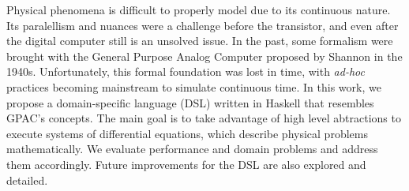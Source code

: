 
Physical phenomena is difficult to properly model due to its continuous nature. Its paralellism and nuances were a challenge before the transistor, and even after the digital computer still is an unsolved issue. In the past, some formalism were brought with the General Purpose Analog Computer proposed by Shannon in the 1940s. Unfortunately, this formal foundation was lost in time, with \textit{ad-hoc} practices becoming mainstream to simulate continuous time. In this work, we propose a domain-specific language (DSL) written in Haskell that resembles GPAC's concepts. The main goal is to take advantage of high level abtractions to execute systems of differential equations, which describe physical problems mathematically. We evaluate performance and domain problems and address them accordingly. Future improvements for the DSL are also explored and detailed.
